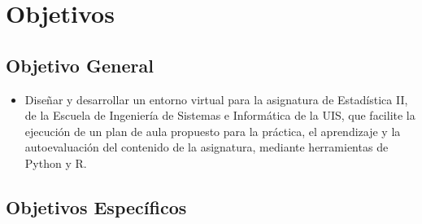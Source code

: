 \documentclass[letter,oneside,12pt,spanish]{report}
\begin{document}

\newpage





\newpage


\chapter{Objetivos}

\section{Objetivo General}

\begin{itemize}
    \item Diseñar y desarrollar un entorno virtual para la asignatura de Estadística II, de la Escuela de Ingeniería de Sistemas e 
    Informática de la UIS, que facilite la ejecución de un plan de aula propuesto para la práctica, el aprendizaje y la autoevaluación 
    del contenido de la asignatura, mediante herramientas de Python y R.
\end{itemize}

\section{Objetivos Específicos}
\end{document}
